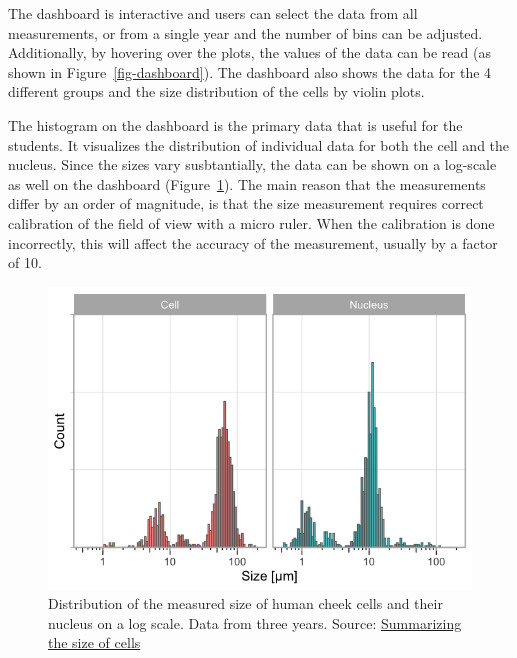 \documentclass[
]{agujournal2019}
\begin{document}
The dashboard is interactive and users can select the data from all
measurements, or from a single year and the number of bins can be
adjusted. Additionally, by hovering over the plots, the values of the
data can be read (as shown in Figure~\ref{fig-dashboard}). The dashboard
also shows the data for the 4 different groups and the size distribution
of the cells by violin plots.

The histogram on the dashboard is the primary data that is useful for
the students. It visualizes the distribution of individual data for both
the cell and the nucleus. Since the sizes vary susbtantially, the data
can be shown on a log-scale as well on the dashboard
(Figure~\ref{fig-histogram}). The main reason that the measurements
differ by an order of magnitude, is that the size measurement requires
correct calibration of the field of view with a micro ruler. When the
calibration is done incorrectly, this will affect the accuracy of the
measurement, usually by a factor of 10.

\begin{figure}[H]

{\centering \includegraphics{index_files/figure-latex/fig-histogram-output-1.png}

}

\caption{\label{fig-histogram}Distribution of the measured size of human
cheek cells and their nucleus on a log scale. Data from three years.
Source:
\href{https://JoachimGoedhart.github.io/MS-StudentSourcing/notebooks/CellSizeR-preview.html\#cell-fig-histogram}{Summarizing
the size of cells}}

\end{figure}
\end{document}
